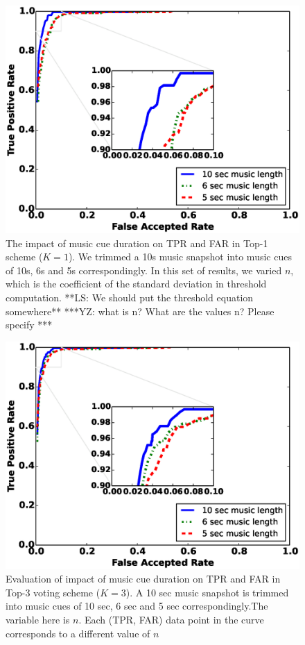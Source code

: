 \begin{figure}[t]
\centering
\includegraphics [width=\columnwidth]{figure/top1_roc.eps}
\caption{The impact of music cue duration on TPR and FAR in Top-1 scheme ($K = 1$). We trimmed a 10s music snapshot into music cues of 10s, 6s and 5s correspondingly. In this set of results, we varied $n$, which is the coefficient of the standard deviation in threshold computation. **LS: We should  put the threshold equation somewhere**  ***YZ: what is n? What are the values n? Please specify ***}
\label{fig:roc-top1}
\end{figure}

\begin{figure}[t]
\centering
\includegraphics [width=\columnwidth]{figure/top3_roc.eps}
\caption{Evaluation of impact of music cue duration on TPR and FAR in Top-3
voting scheme ($K = 3$). A 10 sec music snapshot is trimmed into music cues of
10 sec, 6 sec and 5 sec correspondingly.The variable here is $n$. Each (TPR, FAR) data point in the curve corresponds to a different value of $n$}
\label{fig:roc-top3}
\end{figure}

